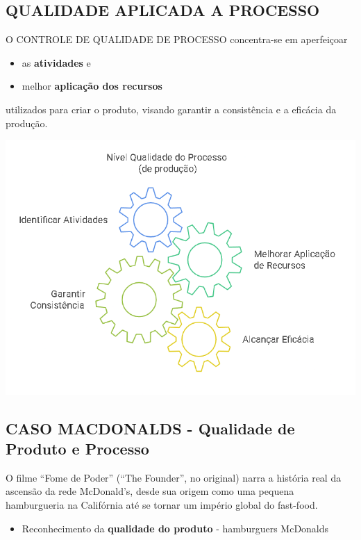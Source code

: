 \documentclass[
]{book}
\providecommand{\tightlist}{%
  \setlength{\itemsep}{0pt}\setlength{\parskip}{0pt}}
\begin{document}
\subsection{QUALIDADE APLICADA A PROCESSO}\label{qualidade-aplicada-a-processo}

O CONTROLE DE QUALIDADE DE PROCESSO concentra-se em aperfeiçoar

\begin{itemize}
\item
  as \textbf{atividades} e
\item
  melhor \textbf{aplicação dos recursos}
\end{itemize}

utilizados para criar o produto, visando garantir a consistência e a eficácia da produção.

\includegraphics{images/qualidade-geral/Qualidade_do_Processo.png}

\subsection{CASO MACDONALDS - Qualidade de Produto e Processo}\label{caso-macdonalds---qualidade-de-produto-e-processo}

O filme ``Fome de Poder'' (``The Founder'', no original) narra a história real da ascensão da rede McDonald's, desde sua origem como uma pequena hamburgueria na Califórnia até se tornar um império global do fast-food.

\begin{itemize}
\tightlist
\item
  Reconhecimento da \textbf{qualidade do produto} - hamburguers McDonalds
\end{itemize}
\end{document}
